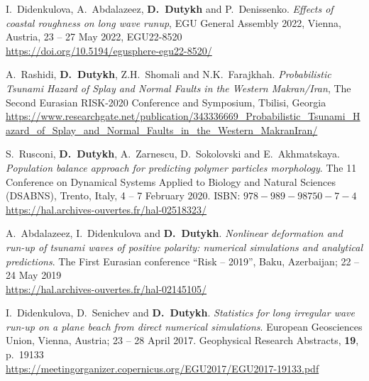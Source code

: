 \begin{etaremune}
  \item I.~Didenkulova, A.~Abdalazeez, \textbf{D.~Dutykh} and P.~Denissenko. \textit{Effects of coastal roughness on long wave runup}, EGU General Assembly 2022, Vienna, Austria, 23 -- 27 May 2022, EGU22-8520 \\
  \url{https://doi.org/10.5194/egusphere-egu22-8520/}


  
  \item A.~Rashidi, \textbf{D.~Dutykh}, Z.H.~Shomali and N.K.~Farajkhah. \textit{Probabilistic Tsunami Hazard of Splay and Normal Faults in the Western Makran/Iran}, The Second Eurasian RISK-2020 Conference and Symposium, Tbilisi, Georgia \\ %
  \url{https://www.researchgate.net/publication/343336669_Probabilistic_Tsunami_Hazard_of_Splay_and_Normal_Faults_in_the_Western_MakranIran/}
  
  \item S.~Rusconi, \textbf{D.~Dutykh}, A.~Zarnescu, D.~Sokolovski and E.~Akhmatskaya. \textit{Population balance approach for predicting polymer particles morphology}. The 11 Conference on Dynamical Systems Applied to Biology and Natural Sciences (DSABNS), Trento, Italy, 4 -- 7 February 2020. ISBN: $978-989-98750-7-4$ \\ %
  \url{https://hal.archives-ouvertes.fr/hal-02518323/}



  \item A.~Abdalazeez, I.~Didenkulova and \textbf{D.~Dutykh}. \textit{Nonlinear deformation and run-up of tsunami waves of positive polarity: numerical simulations and analytical predictions}. The First Eurasian conference ``Risk -- 2019'', Baku, Azerbaijan; 22 -- 24 May 2019 \\ %
  \url{https://hal.archives-ouvertes.fr/hal-02145105/}
  


  \item I.~Didenkulova, D.~Senichev and \textbf{D.~Dutykh}. \textit{Statistics for long irregular wave run-up on a plane beach from direct numerical simulations}. European Geosciences Union, Vienna, Austria; 23 -- 28 April 2017. Geophysical Research Abstracts, \textbf{19}, p.~19133 \\ %
  \url{https://meetingorganizer.copernicus.org/EGU2017/EGU2017-19133.pdf}
  

\end{etaremune}
